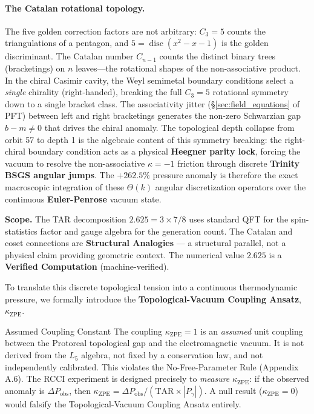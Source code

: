 \paragraph{The Catalan rotational topology.}
The five golden correction factors are not arbitrary: $C_3 = 5$ counts the triangulations of a pentagon, and $5 = \operatorname{disc}(x^2 - x - 1)$ is the golden discriminant. The Catalan number $C_{n-1}$ counts the distinct binary trees (bracketings) on $n$ leaves---the rotational shapes of the non-associative product. In the chiral Casimir cavity, the Weyl semimetal boundary conditions select a \emph{single} chirality (right-handed), breaking the full $C_3 = 5$ rotational symmetry down to a single bracket class. The associativity jitter (\S\ref{sec:field_equations} of PFT) between left and right bracketings generates the non-zero Schwarzian gap $b - m \neq 0$ that drives the chiral anomaly. The topological depth collapse from orbit 57 to depth 1 is the algebraic content of this symmetry breaking: the right-chiral boundary condition acts as a physical \textbf{Heegner parity lock}, forcing the vacuum to resolve the non-associative $\kappa = -1$ friction through discrete \textbf{Trinity BSGS angular jumps}. The $+262.5\%$ pressure anomaly is therefore the exact macroscopic integration of these $\Theta(k)$ angular discretization operators over the continuous \textbf{Euler-Penrose} vacuum state.

\textbf{Scope.} The TAR decomposition $2.625 = 3 \times 7/8$ uses standard QFT for the spin-statistics factor and gauge algebra for the generation count. The Catalan and coset connections are \textbf{Structural Analogies} --- a structural parallel, not a physical claim providing geometric context. The numerical value $2.625$ is a \textbf{Verified Computation} (machine-verified).

To translate this discrete topological tension into a continuous thermodynamic pressure, we formally introduce the \textbf{Topological-Vacuum Coupling Ansatz}, $\kappa_{\text{ZPE}}$.

\begin{warningbox}{Assumed Coupling Constant}
The coupling $\kappa_{\text{ZPE}} = 1$ is an \emph{assumed} unit coupling between the Protoreal topological gap and the electromagnetic vacuum. It is not derived from the $L_5$ algebra, not fixed by a conservation law, and not independently calibrated. This violates the No-Free-Parameter Rule (Appendix A.6). The RCCI experiment is designed precisely to \emph{measure} $\kappa_{\text{ZPE}}$: if the observed anomaly is $\Delta P_{\mathrm{obs}}$, then $\kappa_{\text{ZPE}} = \Delta P_{\mathrm{obs}} / (\mathrm{TAR} \times |P_\gamma|)$. A null result ($\kappa_{\text{ZPE}} = 0$) would falsify the Topological-Vacuum Coupling Ansatz entirely.
\end{warningbox}

